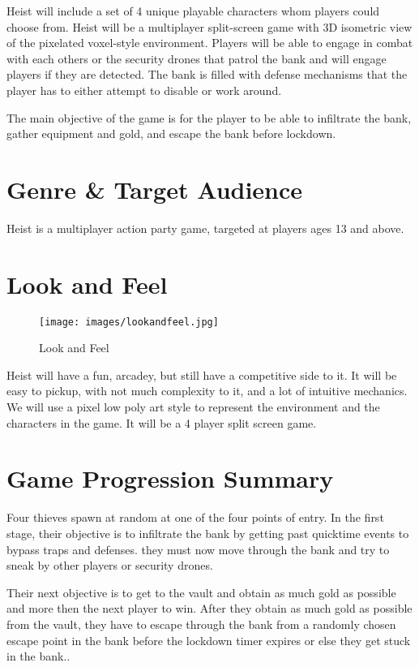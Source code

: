 \documentclass[10pt]{report}
\begin{document}
Heist will include a set of 4 unique playable characters whom players could choose from. Heist will be a multiplayer split-screen game with 3D isometric view of the pixelated voxel-style environment. Players will be able to engage in combat with each others or the security drones that patrol the bank and will engage players if they are detected. The bank is filled with defense mechanisms that the player has to either attempt to disable or work around.

The main objective of the game is for the player to be able to infiltrate the bank, gather equipment and gold, and escape the bank before lockdown.

\section{Genre \& Target Audience}

Heist is a multiplayer action party game, targeted at players ages 13 and above.

\section{Look and Feel}

\begin{figure}[H]
    \centering
    \texttt{[image: images/lookandfeel.jpg]}
    \caption{Look and Feel}
\end{figure}

Heist will have a fun, arcadey, but still have a competitive side to it. It will be easy to pickup, with not much complexity to it, and a lot of intuitive mechanics. We will use a pixel low poly art style to represent the environment and the characters in the game. It will be a 4 player split screen game.

\section{Game Progression Summary}

Four thieves spawn at random at one of the four points of entry. In the first stage, their objective is to infiltrate the bank by getting past quicktime events to bypass traps and defenses. they must now move through the bank and try to sneak by other players or security drones. 

Their next objective is to get to the vault and obtain as much gold as possible and more then the next player to win. After they obtain as much gold as possible from the vault, they have to escape through the bank from a randomly chosen escape point in the bank before the lockdown timer expires or else they get stuck in the bank..
\end{document}
